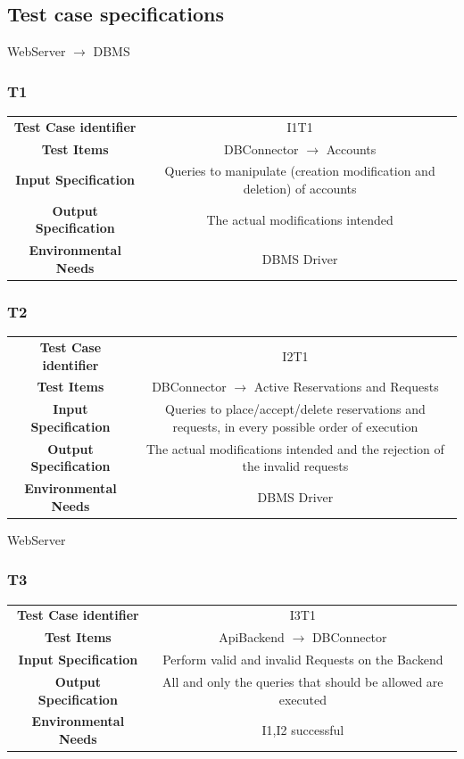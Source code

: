 \documentclass{article}
\begin{document}
\subsection{Test case specifications}
WebServer $\rightarrow$ DBMS
\subsubsection{T1}
\begin{adjustbox}{width=1.2\textwidth}	
	\begin{tabular}{*{2}{c}}
		\toprule
		\textbf{Test Case identifier} & I1T1\\
		\textbf{Test Items} & DBConnector $\rightarrow$ Accounts \\
		\textbf{Input Specification} & Queries to manipulate (creation modification and deletion) of accounts\\
		\textbf{Output Specification} & The actual modifications intended\\
		\textbf{Environmental Needs} & DBMS Driver\\
		\bottomrule
	\end{tabular}
\end{adjustbox}
\subsubsection{T2}
\begin{adjustbox}{width=1.2\textwidth}	
	\begin{tabular}{*{2}{c}}
		\toprule
		\textbf{Test Case identifier} & I2T1\\
		\textbf{Test Items} & DBConnector $\rightarrow$ Active Reservations and Requests \\
		\textbf{Input Specification} & Queries to place/accept/delete reservations and requests, in every possible order of execution\\
		\textbf{Output Specification} & The actual modifications intended and the rejection of the invalid requests\\
		\textbf{Environmental Needs} & DBMS Driver\\
		\bottomrule
	\end{tabular}
\end{adjustbox}

WebServer 
\subsubsection{T3}
\begin{adjustbox}{width=1.2\textwidth}	
	\begin{tabular}{*{2}{c}}
		\toprule
		\textbf{Test Case identifier} & I3T1\\
		\textbf{Test Items} & ApiBackend $\rightarrow$ DBConnector\\
		\textbf{Input Specification} & Perform valid and invalid Requests on the Backend\\
		\textbf{Output Specification} & All and only the queries that should be allowed are executed\\
		\textbf{Environmental Needs} & I1,I2 successful\\
		\bottomrule
	\end{tabular}
\end{adjustbox}
\end{document}

